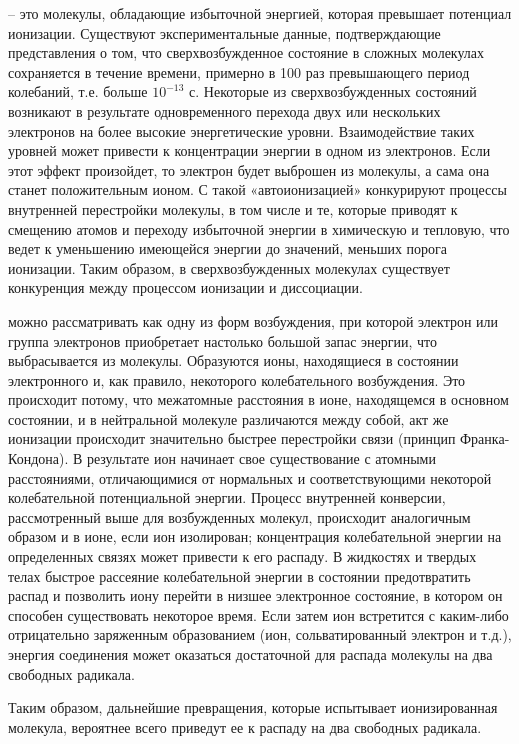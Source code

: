 \documentclass[a4paper, 14pt]{article}
\renewcommand{\emph}[1]{{\color{orange}{\textit{\textbf{#1}}}}}
\begin{document}
\emph{Сверхвозбужденные молекулы} – это молекулы, обладающие избыточной
энергией, которая превышает потенциал ионизации. Существуют экспериментальные
данные, подтверждающие представления о том, что сверхвозбужденное состояние в
сложных молекулах сохраняется в течение времени, примерно в 100 раз
превышающего период колебаний, т.е. больше $10^{-13}$ с. Некоторые из
сверхвозбужденных состояний возникают в результате одновременного перехода двух
или нескольких электронов на более высокие энергетические уровни. Взаимодействие
таких уровней может привести к концентрации энергии в одном из электронов. Если
этот эффект произойдет, то электрон будет выброшен из молекулы, а сама она станет
положительным ионом. С такой «автоионизацией» конкурируют процессы внутренней
перестройки молекулы, в том числе и те, которые приводят к смещению атомов и
переходу избыточной энергии в химическую и тепловую, что ведет к уменьшению
имеющейся энергии до значений, меньших порога ионизации. Таким образом, в
сверхвозбужденных молекулах существует конкуренция между процессом ионизации
и диссоциации.

\emph{Ионизацию} можно рассматривать как одну из форм возбуждения, при которой
электрон или группа электронов приобретает настолько большой запас энергии, что
выбрасывается из молекулы. Образуются ионы, находящиеся в состоянии
электронного и, как правило, некоторого колебательного возбуждения. Это
происходит потому, что межатомные расстояния в ионе, находящемся в основном
состоянии, и в нейтральной молекуле различаются между собой, акт же ионизации
происходит значительно быстрее перестройки связи (принцип Франка-Кондона). В
результате ион начинает свое существование с атомными расстояниями,
отличающимися от нормальных и соответствующими некоторой колебательной
потенциальной энергии. Процесс внутренней конверсии, рассмотренный выше для
возбужденных молекул, происходит аналогичным образом и в ионе, если ион
изолирован; концентрация колебательной энергии на определенных связях может
привести к его распаду. В жидкостях и твердых телах быстрое рассеяние колебательной энергии в состоянии предотвратить распад и позволить иону перейти в
низшее электронное состояние, в котором он способен существовать некоторое время.
Если затем ион встретится с каким-либо отрицательно заряженным образованием
(ион, сольватированный электрон и т.д.), энергия соединения может оказаться
достаточной для распада молекулы на два свободных радикала.

Таким образом, дальнейшие превращения, которые испытывает ионизированная
молекула, вероятнее всего приведут ее к распаду на два свободных радикала.
\end{document}
